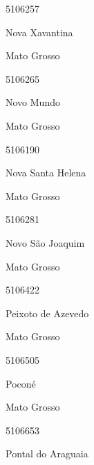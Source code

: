 \documentclass[
  letterpaper,
]{report}
\begin{document}
5106257

\n      

Nova Xavantina

\n    

\n    

\n      

Mato Grosso

\n      

5106265

\n      

Novo Mundo

\n    

\n    

\n      

Mato Grosso

\n      

5106190

\n      

Nova Santa Helena

\n    

\n    

\n      

Mato Grosso

\n      

5106281

\n      

Novo São Joaquim

\n    

\n    

\n      

Mato Grosso

\n      

5106422

\n      

Peixoto de Azevedo

\n    

\n    

\n      

Mato Grosso

\n      

5106505

\n      

Poconé

\n    

\n    

\n      

Mato Grosso

\n      

5106653

\n      

Pontal do Araguaia

\n    
\end{document}
